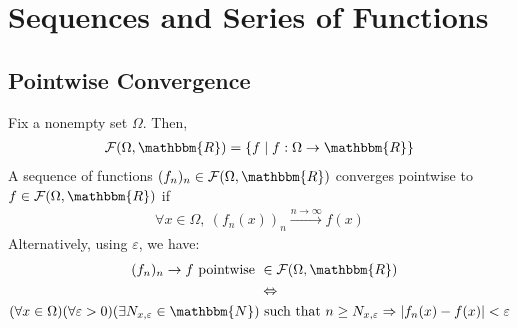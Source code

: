 \documentclass[10pt]{extarticle}
\newcommand{\N}{\mathbbm{N}}
\newcommand{\R}{\mathbbm{R}}
\begin{document}
  \section{Sequences and Series of Functions}%
  \subsection{Pointwise Convergence}%
    Fix a nonempty set $\Omega$. Then,
    \begin{align*}
      \mathcal{F}(\Omega,\R) = \left\{f\mid f: \Omega \rightarrow \R\right\}
    \end{align*}
    A sequence of functions $(f_n)_n\in \mathcal{F}(\Omega,\R)$ converges pointwise to $f\in \mathcal{F}(\Omega,\R)$ if
    \begin{align*}
      \forall x\in\Omega,~(f_n(x))_n \xrightarrow{n\rightarrow\infty}f(x)
    \end{align*}
    Alternatively, using $\varepsilon$, we have:
    \begin{align*}
      (f_n)_n \rightarrow f \text{ pointwise } &\in \mathcal{F}(\Omega,\R)\\
                                               &\Leftrightarrow\\
      (\forall x\in\Omega)(\forall \varepsilon > 0) (\exists N_{x,\varepsilon}\in\N) &\text{ such that } n\geq N_{x,\varepsilon} \Rightarrow \left|f_n(x) - f(x)\right| < \varepsilon
    \end{align*}
\end{document}
